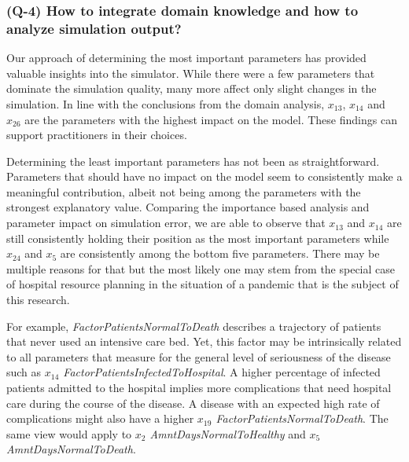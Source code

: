 \documentclass[conference]{IEEEtran}
\newcommand{\babsimhospital}{\textsc{BaBSim.Hospital}\xspace}
\begin{document}
\subsubsection*{\textbf{(Q-4)} How to integrate domain knowledge and how to analyze simulation output?}
Our approach of determining the most important parameters has provided valuable insights into the simulator.
While there were a few parameters that dominate the simulation quality, many more affect only slight changes in the simulation.
In line with the conclusions from the domain analysis, \emph{$x_{13}$}, \emph{$x_{14}$} and \emph{$x_{26}$} are the parameters with the highest impact on the model.
These findings can support practitioners in their choices.

Determining the least important parameters has not been as straightforward. 
Parameters that should have no impact on the model seem to consistently make a meaningful contribution, albeit not being among the parameters with the strongest explanatory value. 
Comparing the importance based analysis and parameter impact on simulation error, we are able to observe that \emph{$x_{13}$} and \emph{$x_{14}$} are still consistently holding their position as the most important parameters while \emph{$x_{24}$} and \emph{$x_{5}$} are consistently among the bottom five parameters.
There may be multiple reasons for that but the most likely one may stem from the special case of hospital resource planning in the situation of a pandemic that is the subject of this research. 

For example, \emph{FactorPatientsNormalToDeath} describes a trajectory of patients that never used an intensive care bed. 
Yet, this factor may be intrinsically related to all parameters that measure for the general level of seriousness of the disease such as \emph{$x_{14}$ FactorPatientsInfectedToHospital}. 
A higher percentage of infected patients admitted to the hospital implies more complications that need hospital care during the course of the disease. 
A disease with an expected high rate of complications might also have a higher \emph{$x_{19}$ FactorPatientsNormalToDeath}. 
The same view would apply to \emph{$x_{2}$	AmntDaysNormalToHealthy} and \emph{$x_{5}$ AmntDaysNormalToDeath}.


\end{document}
